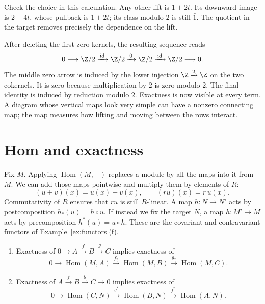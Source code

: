 Check the choice in this calculation. Any other lift is $1+2t$. Its downward image is $2+4t$, whose pullback is $1+2t$; its class modulo $2$ is still $\bar1$. The quotient in the target removes precisely the dependence on the lift.

After deleting the first zero kernels, the resulting sequence reads
\[
0\longrightarrow\Z/2\xrightarrow{\,\mathrm{id}\,}\Z/2
 \xrightarrow{\,0\,}\Z/2
 \xrightarrow{\,\mathrm{id}\,}\Z/2\longrightarrow0.
\]
The middle zero arrow is induced by the lower injection $\Z\xrightarrow2\Z$ on the two cokernels. It is zero because multiplication by $2$ is zero modulo $2$. The final identity is induced by reduction modulo $2$. Exactness is now visible at every term. A diagram whose vertical maps look very simple can have a nonzero connecting map; the map measures how lifting and moving between the rows interact.

\section{Hom and exactness}

Fix $M$. Applying $\operatorname{Hom}(M,-)$ replaces a module by all the maps into it from $M$. We can add those maps pointwise and multiply them by elements of $R$:
\[
(u+v)(x)=u(x)+v(x),\qquad (ru)(x)=r\,u(x).
\]
Commutativity of $R$ ensures that $ru$ is still $R$-linear. A map $h\colon N\to N'$ acts by postcomposition $h_*(u)=h\circ u$. If instead we fix the target $N$, a map $h\colon M'\to M$ acts by precomposition $h^*(u)=u\circ h$. These are the covariant and contravariant functors of Example~\ref{ex:functors}(f).

\begin{proposition}\label{prop:homleft}
\leavevmode
\begin{enumerate}[label=(\alph*)]
\item Exactness of $0\to A\xrightarrow f B\xrightarrow g C$ implies exactness of
\[
0\to\operatorname{Hom}(M,A)\xrightarrow{f_*}\operatorname{Hom}(M,B)
\xrightarrow{g_*}\operatorname{Hom}(M,C).
\]
\item Exactness of $A\xrightarrow f B\xrightarrow g C\to0$ implies exactness of
\[
0\to\operatorname{Hom}(C,N)\xrightarrow{g^*}\operatorname{Hom}(B,N)
\xrightarrow{f^*}\operatorname{Hom}(A,N).
\]
\end{enumerate}
\end{proposition}

